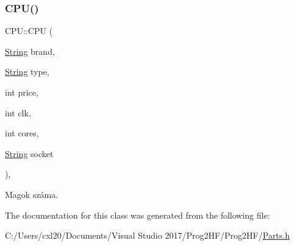 \subsubsection{\texorpdfstring{CPU()}{CPU()}}
{\footnotesize\ttfamily C\+P\+U\+::\+C\+PU (\begin{DoxyParamCaption}\item[{\mbox{\hyperlink{class_string}{String}}}]{brand,  }\item[{\mbox{\hyperlink{class_string}{String}}}]{type,  }\item[{int}]{price,  }\item[{int}]{clk,  }\item[{int}]{cores,  }\item[{\mbox{\hyperlink{class_string}{String}}}]{socket }\end{DoxyParamCaption})\hspace{0.3cm}{\ttfamily [inline]}, {\ttfamily [explicit]}}



Magok száma. 



The documentation for this class was generated from the following file\+:\begin{DoxyCompactItemize}
\item 
C\+:/\+Users/cxl20/\+Documents/\+Visual Studio 2017/\+Prog2\+H\+F/\+Prog2\+H\+F/\mbox{\hyperlink{_parts_8h}{Parts.\+h}}\end{DoxyCompactItemize}
